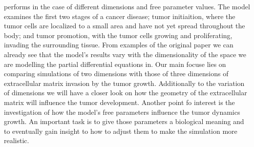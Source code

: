 performs in the case of different dimensions and free parameter values. The model examines the first two stages of a cancer disease; tumor initiaition, where the tumor cells are localized to a small area and have not yet spread throughout the body; and tumor promotion, with the tumor cells growing and proliferating, invading the surrounding tissue. From examples of the original paper we can already see that the model's results vary with the dimensionality of the space we are modelling the partial differential equations in. 
Our main focuse lies on comparing simulations of two dimensions with those of three dimensions of extracellular matrix invasion by the tumor growth. Additionally to the variation of dimensions we will have a closer look on how the geometry of the extracellular matrix will influence the tumor development. \newline 
Another point fo interest is the investigation of how the model's free parameters influence the 
tumor dynamics growth. An important task is to give those parameters a biological meaning and 
to eventually gain insight to how to adjust them to make the simulation more realistic.